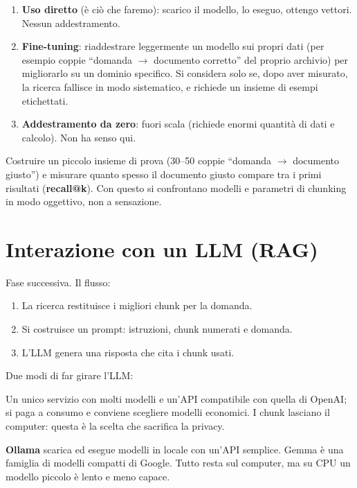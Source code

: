\documentclass[11pt,a4paper]{article}
\begin{document}
\begin{enumerate}
  \item \textbf{Uso diretto} (è ciò che faremo): scarico il modello, lo eseguo, ottengo vettori. Nessun addestramento.
  \item \textbf{Fine-tuning}: riaddestrare leggermente un modello sui propri dati (per esempio coppie ``domanda $\to$ documento corretto'' del proprio archivio) per migliorarlo su un dominio specifico. Si considera solo se, dopo aver misurato, la ricerca fallisce in modo sistematico, e richiede un insieme di esempi etichettati.
  \item \textbf{Addestramento da zero}: fuori scala (richiede enormi quantità di dati e calcolo). Non ha senso qui.
\end{enumerate}

\begin{idea}
Costruire un piccolo insieme di prova (30--50 coppie ``domanda $\to$ documento giusto'') e misurare quanto spesso il documento giusto compare tra i primi risultati (\textbf{recall@k}). Con questo si confrontano modelli e parametri di chunking in modo oggettivo, non a sensazione.
\end{idea}

\section{Interazione con un LLM (RAG)}

Fase successiva. Il flusso:
\begin{enumerate}
  \item La ricerca restituisce i migliori chunk per la domanda.
  \item Si costruisce un prompt: istruzioni, chunk numerati e domanda.
  \item L'LLM genera una risposta che cita i chunk usati.
\end{enumerate}

Due modi di far girare l'LLM:
\begin{description}[style=nextline,leftmargin=1em]
  \item[API (OpenRouter)] Un unico servizio con molti modelli e un'API compatibile con quella di OpenAI; si paga a consumo e conviene scegliere modelli economici. I chunk lasciano il computer: questa è la scelta che sacrifica la privacy.
  \item[Locale (Ollama + Gemma)] \textbf{Ollama} scarica ed esegue modelli in locale con un'API semplice. Gemma è una famiglia di modelli compatti di Google. Tutto resta sul computer, ma su CPU un modello piccolo è lento e meno capace.
\end{description}
\end{document}
